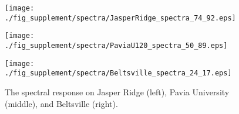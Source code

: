 \begin{figure*}[t]
	\begin{center}
		\begin{minipage}{0.32\hsize}
			\centerline{\texttt{[image: ./fig\_supplement/spectra/JasperRidge\_spectra\_74\_92.eps]}} %
		\end{minipage}
		\begin{minipage}{0.32\hsize}
			\centerline{\texttt{[image: ./fig\_supplement/spectra/PaviaU120\_spectra\_50\_89.eps]}} %
		\end{minipage}
		\begin{minipage}{0.32\hsize}
			\centerline{\texttt{[image: ./fig\_supplement/spectra/Beltsville\_spectra\_24\_17.eps]}} %
		\end{minipage}
		
	\end{center}
	
	\vspace{-3mm}
	\caption{The spectral response on Jasper Ridge (left), Pavia University (middle), and Beltsville (right).}
	
	\label{fig:spectral_response}
\end{figure*}